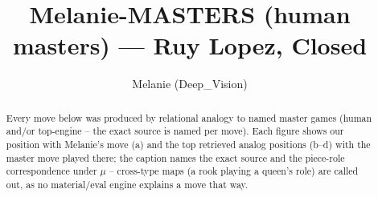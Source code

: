 \documentclass[11pt]{article}
\title{Melanie-MASTERS (human masters) — Ruy Lopez, Closed}
\author{Melanie (Deep\_Vision)}
\date{}
\begin{document}
\maketitle

\begin{abstract}Every move below was produced by relational analogy to named master games (human and/or top-engine -- the exact source is named per move). Each figure shows our position with Melanie's move (a) and the top retrieved analog positions (b--d) with the master move played there; the caption names the exact source and the piece-role correspondence under $\mu$ -- cross-type maps (a rook playing a queen's role) are called out, as no material/eval engine explains a move that way.\end{abstract}

\begin{figure}[p]\centering
\begin{subfigure}{0.46\textwidth}\centering
\resizebox{\linewidth}{!}{%
\newchessgame
\chessboard[
  setfen={r1bqk2r/2p1bppp/p1np1n2/1p2p3/4P3/1B3N2/PPPP1PPP/RNBQR1K1 w kq - 0 8},
  showmover=false,
  pgfstyle=straightmove, color=movearrow, markmove={a2-a4}
]}
\caption{}
\end{subfigure}\hfill
\begin{subfigure}{0.46\textwidth}\centering
\resizebox{\linewidth}{!}{%
\newchessgame
\chessboard[
  setfen={r1bqk2r/4bppp/ppn1p3/2p5/P1NnN3/8/BPPP1PPP/R1BQ1RK1 w kq - 0 12},
  showmover=false,
  pgfstyle=straightmove, color=movearrow, markmove={d2-d3}
]}
\caption{}
\end{subfigure}
\\[4pt]
\begin{subfigure}{0.46\textwidth}\centering
\resizebox{\linewidth}{!}{%
\newchessgame
\chessboard[
  setfen={1r1qkb1r/4pppp/p4n2/3p1b2/Pn1P4/2N1PN2/1P1K1PPP/R1BQ1B1R b k - 10 14},
  showmover=false,
  pgfstyle=straightmove, color=movearrow, markmove={d8-a5}
]}
\caption{}
\end{subfigure}\hfill


\end{figure}
\end{document}
